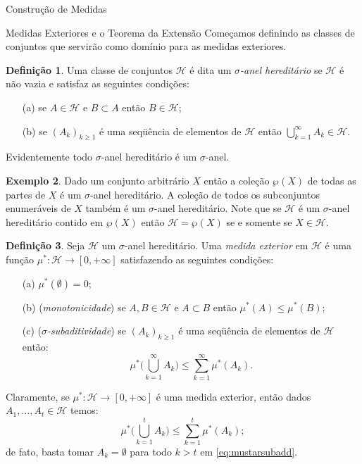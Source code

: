\documentclass[oneside,final,11pt]{amsbook}
\theoremstyle{remark}\newtheorem{exercise}{Exercício}[chapter]
\theoremstyle{remark}\newtheorem{*exercise}[exercise]{\hbox to 0pt{\hskip 0pt minus 1fil*}Exercício}
\theoremstyle{definition}\newtheorem{exdefin}{Definição}[chapter]
\theoremstyle{plain}\newtheorem{teo}{Teorema}[section]
\theoremstyle{plain}\newtheorem{lem}[teo]{Lema}
\theoremstyle{plain}\newtheorem{prop}[teo]{Proposição}
\theoremstyle{plain}\newtheorem{cor}[teo]{Corolário}
\theoremstyle{definition}\newtheorem{defin}[teo]{Definição}
\theoremstyle{remark}\newtheorem{rem}[teo]{Observação}
\theoremstyle{definition}\newtheorem{notation}[teo]{Notação}
\theoremstyle{definition}\newtheorem{convention}[teo]{Convenção}
\theoremstyle{definition}\newtheorem{example}[teo]{Exemplo}
\numberwithin{section}{chapter}
\numberwithin{equation}{section}
\begin{document}
\begin{chapter}{Construção de Medidas}
\begin{section}{Medidas Exteriores e o Teorema da Extensão}
Começamos definindo as classes de conjuntos que servirão como domínio para as medidas exteriores.
\begin{defin}
Uma classe de conjuntos $\mathcal H$ é dita um {\em $\sigma$-anel
hereditário\/}
se $\mathcal H$ é não vazia e satisfaz as seguintes condições:
\begin{itemize}
\item[(a)] se $A\in\mathcal H$ e $B\subset A$ então $B\in\mathcal H$;
\item[(b)] se $(A_k)_{k\ge1}$ é uma seqüência de elementos de $\mathcal H$ então
$\bigcup_{k=1}^\infty A_k\in\mathcal H$.
\end{itemize}
\end{defin}
Evidentemente todo $\sigma$-anel hereditário é um $\sigma$-anel.

\begin{example}
Dado um conjunto arbitrário $X$ então a coleção $\wp(X)$ de todas as partes de $X$
é um $\sigma$-anel hereditário. A coleção de todos os subconjuntos enumeráveis de $X$
também é um $\sigma$-anel hereditário. Note que se $\mathcal H$ é um $\sigma$-anel hereditário
contido em $\wp(X)$ então $\mathcal H=\wp(X)$ se e somente se $X\in\mathcal H$.
\end{example}

\begin{defin}
Seja $\mathcal H$ um $\sigma$-anel hereditário. Uma {\em medida exterior\/} em $\mathcal H$
é uma função $\mu^*:\mathcal H\to[0,+\infty]$ satisfazendo as seguintes condições:
\begin{itemize}
\item[(a)] $\mu^*(\emptyset)=0$;
\item[(b)] ({\em monotonicidade}) se $A,B\in\mathcal H$ e $A\subset B$ então
$\mu^*(A)\le\mu^*(B)$;
\item[(c)] ({\em $\sigma$-subaditividade})
se $(A_k)_{k\ge1}$ é uma seqüência de elementos de $\mathcal H$ então:
\begin{equation}\label{eq:mustarsubadd}
\mu^*\Big(\bigcup_{k=1}^\infty A_k\Big)\le\sum_{k=1}^\infty\mu^*(A_k).
\end{equation}
\end{itemize}
\end{defin}
Claramente, se $\mu^*:\mathcal H\to[0,+\infty]$ é uma medida exterior, então dados $A_1,\ldots,A_t\in\mathcal H$
temos:
\[\mu^*\Big(\bigcup_{k=1}^tA_k\Big)\le\sum_{k=1}^t\mu^*(A_k);\]
de fato, basta tomar $A_k=\emptyset$ para todo $k>t$ em \eqref{eq:mustarsubadd}.


\end{section}
\end{chapter}
\end{document}
